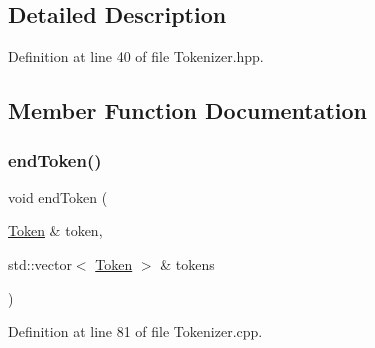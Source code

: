 \subsection{Detailed Description}


Definition at line 40 of file Tokenizer.\+hpp.



\subsection{Member Function Documentation}
\mbox{\label{classft_1_1_tokenizer_a4d9a98ce2e5ef728cfa5a68c8f726587}} 
\subsubsection{\texorpdfstring{end\+Token()}{endToken()}}
{\footnotesize\ttfamily void end\+Token (\begin{DoxyParamCaption}\item[{\hyperlink{classft_1_1_token}{Token} \&}]{token,  }\item[{std\+::vector$<$ \hyperlink{classft_1_1_token}{Token} $>$ \&}]{tokens }\end{DoxyParamCaption})\hspace{0.3cm}{\ttfamily [private]}}



Definition at line 81 of file Tokenizer.\+cpp.


